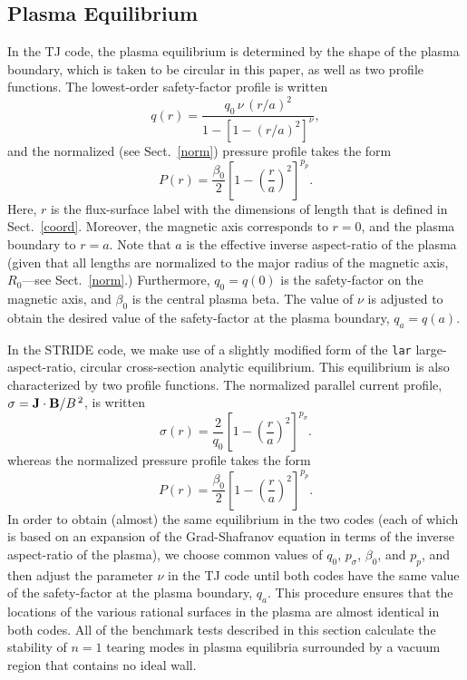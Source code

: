 \documentclass[12pt,prb,aps]{revtex4-1}
\begin{document}
\subsection{Plasma Equilibrium}
In the TJ code, the plasma equilibrium is determined by the shape of the plasma boundary, which is taken to be circular in this paper, as well as two profile functions. 
The lowest-order safety-factor profile is written\,\cite{tj}
\begin{equation}
q(r) = \frac{q_0\,\nu\,(r/a)^2}{1-[1-(r/a)^2]^\nu},
\end{equation}
and the normalized (see Sect.~\ref{norm}) pressure profile takes the form
\begin{equation}
P(r) = \frac{\beta_0}{2}\left[1-\left(\frac{r}{a}\right)^2\right]^{p_p}.
\end{equation}
Here, $r$ is the flux-surface label with the dimensions of length that is defined in Sect.~\ref{coord}.  Moreover, the magnetic axis corresponds to $r=0$, and the plasma
boundary to $r=a$.  Note that $a$ is the effective inverse aspect-ratio of the plasma (given that all lengths are normalized to the major radius of the magnetic axis, $R_0$---see Sect.~\ref{norm}.)
Furthermore, $q_0=q(0)$ is the safety-factor on the magnetic axis, and  $\beta_0$ is the central plasma beta. 
The value of $\nu$ is adjusted to obtain the desired value of the safety-factor at the plasma boundary, $q_a=q(a)$. 

In the  STRIDE code, we make use of a slightly modified form of the \verb|lar| 
large-aspect-ratio, circular cross-section analytic equilibrium. This equilibrium is also characterized by two profile functions. 
The 
 normalized parallel current profile, $\sigma={\bf J}\cdot{\bf B}/B^{\,2}$,  is written
\begin{equation}
\sigma(r) = \frac{2}{q_0}\left[1-\left(\frac{r}{a}\right)^2\right]^{p_\sigma}.
\end{equation}
whereas the  normalized pressure profile takes the form
\begin{equation}
P(r)= \frac{\beta_0}{2}\left[1-\left(\frac{r}{a}\right)^2\right]^{p_p}.
\end{equation}
In order to obtain (almost) the same equilibrium in the two codes (each of which is based on an expansion of the Grad-Shafranov equation in terms of the inverse aspect-ratio of the plasma), we choose common values of $q_0$, $p_\sigma$, $\beta_0$, and $p_p$, and then
adjust the parameter $\nu$ in the TJ code until both codes have the same value of the safety-factor at the plasma boundary, $q_a$. This procedure ensures that the locations of the various rational surfaces in the plasma are
almost identical in both codes. All of the benchmark tests  described in this section calculate the stability of $n=1$ tearing modes  in  plasma equilibria surrounded by a vacuum region that contains no ideal wall. 
\end{document}

